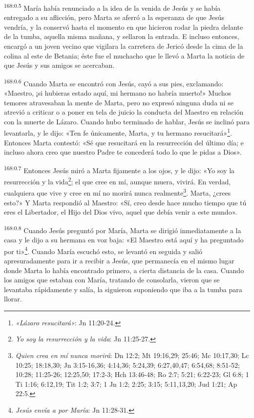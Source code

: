 \par 
\textsuperscript{168:0.5} María había renunciado a la idea de la venida de Jesús y se había entregado a su aflicción, pero Marta se aferró a la esperanza de que Jesús vendría, y la conservó hasta el momento en que hicieron rodar la piedra delante de la tumba, aquella misma mañana, y sellaron la entrada. E incluso entonces, encargó a un joven vecino que vigilara la carretera de Jericó desde la cima de la colina al este de Betania; éste fue el muchacho que le llevó a Marta la noticia de que Jesús y sus amigos se acercaban.

\par 
\textsuperscript{168:0.6} Cuando Marta se encontró con Jesús, cayó a sus pies, exclamando: «Maestro, ¡si hubieras estado aquí, mi hermano no habría muerto!» Muchos temores atravesaban la mente de Marta, pero no expresó ninguna duda ni se atrevió a criticar o a poner en tela de juicio la conducta del Maestro en relación con la muerte de Lázaro. Cuando hubo terminado de hablar, Jesús se inclinó para levantarla, y le dijo: «Ten fe únicamente, Marta, y tu hermano resucitará»\footnote{\textit{«Lázaro resucitará»}: Jn 11:20-24.}. Entonces Marta contestó: «Sé que resucitará en la resurrección del último día; e incluso ahora creo que nuestro Padre te concederá todo lo que le pidas a Dios».

\par 
\textsuperscript{168:0.7} Entonces Jesús miró a Marta fijamente a los ojos, y le dijo: «Yo soy la resurrección y la vida\footnote{\textit{Yo soy la resurrección y la vida}: Jn 11:25-27.}; el que cree en mí, aunque muera, vivirá. En verdad, cualquiera que vive y cree en mí no morirá nunca realmente\footnote{\textit{Quien crea en mí nunca morirá}: Dn 12:2; Mt 19:16,29; 25:46; Mc 10:17,30; Lc 10:25; 18:18,30; Jn 3:15-16,36; 4:14,36; 5:24,39; 6:27,40,47; 6:54,68; 8:51-52; 10:28; 11:25-26; 12:25,50; 17:2-3; Hch 13:46-48; Ro 2:7; 5:21; 6:22-23; Gl 6:8; 1 Ti 1:16; 6:12,19; Tit 1:2; 3:7; 1 Jn 1:2; 2:25; 3:15; 5:11,13,20; Jud 1:21; Ap 22:5.}. Marta, ¿crees esto?» Y Marta respondió al Maestro: «Sí, creo desde hace mucho tiempo que tú eres el Libertador, el Hijo del Dios vivo, aquel que debía venir a este mundo».

\par 
\textsuperscript{168:0.8} Cuando Jesús preguntó por María, Marta se dirigió inmediatamente a la casa y le dijo a su hermana en voz baja: «El Maestro está aquí y ha preguntado por ti»\footnote{\textit{Jesús envía a por María}: Jn 11:28-31.}. Cuando María escuchó esto, se levantó en seguida y salió apresuradamente para ir a recibir a Jesús, que permanecía en el mismo lugar donde Marta lo había encontrado primero, a cierta distancia de la casa. Cuando los amigos que estaban con María, tratando de consolarla, vieron que se levantaba rápidamente y salía, la siguieron suponiendo que iba a la tumba para llorar.

